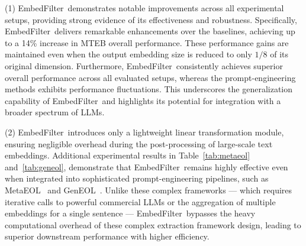 \documentclass{llmxive}
\providecommand{\name}{EmbedFilter}
\begin{document}
\begin{table}[t]
    \centering
    \small
    \vskip -0.05in
    \label{tab:geneol}
\caption{Performance of \name\ on STS tasks under the GenEOL framework.}
\end{table}


(1) \name\ demonstrates notable improvements across all experimental setups, providing strong evidence of its effectiveness and robustness. 
Specifically, \name\ delivers remarkable enhancements over the baselines, achieving up to a 14\% increase in MTEB overall performance.
These performance gains are maintained even when the output embedding size is reduced to only $1/8$ of its original dimension. 
Furthermore, \name\ consistently achieves superior overall performance across all evaluated setups, whereas the prompt-engineering methods exhibits performance fluctuations.
This underscores the generalization capability of \name\ and highlights its potential for integration with a broader spectrum of LLMs.

(2) \name\ introduces only a lightweight linear transformation module, ensuring negligible overhead during the post-processing of large-scale text embeddings.
Additional experimental results in Table~\ref{tab:metaeol} and~\ref{tab:geneol}, demonstrate that \name\ remains highly effective even when integrated into sophisticated prompt-engineering pipelines, such as MetaEOL~\cite{metaeol} and GenEOL~\cite{geneol}.
Unlike these complex frameworks --- which requires iterative calls to powerful commercial LLMs or the aggregation of multiple embeddings for a single sentence ---
\name\ bypasses the heavy computational overhead of these complex extraction framework design, leading to superior downstream performance with higher efficiency.
\end{document}
